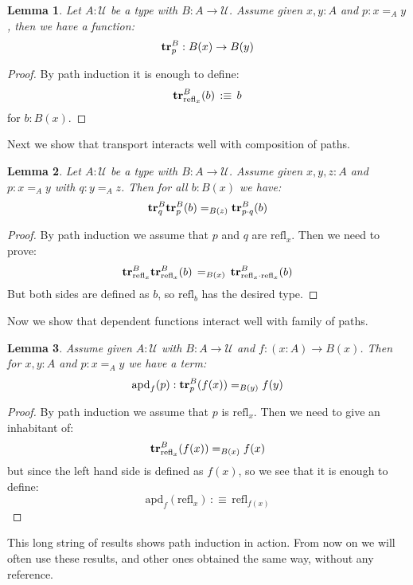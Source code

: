 \documentclass{article}
\newcommand{\sse}[1]{\medbreak \subsection{#1}}
\newcommand{\U}{{\mathcal U}}
\renewcommand{\r}{\rightarrow}
\newcommand{\apd}{\mathrm{apd}}
\newcommand{\refl}{\mathrm{refl}}
\newcommand{\id}{\mathrm{\bf id}}
\newcommand{\tr}{\mathrm{\bf tr}}
\newtheorem{lemma}{Lemma}
\begin{document}
\begin{lemma}
Let $A:\U$ be a type with $B:A\r \U$. Assume given $x,y:A$ and $p:x=_Ay$, then we have a function:
\[\tr_p^B : B(x) \r B(y)\]
\end{lemma}
\begin{proof}
By path induction it is enough to define:
\[\tr_{\refl_x}^B(b) \, :\equiv \, b\]
for $b:B(x)$.
\end{proof}

Next we show that transport interacts well with composition of paths. %

\begin{lemma}
Let $A:\U$ be a type with $B:A\r \U$. Assume given $x,y,z:A$ and $p:x=_Ay$ with $q:y=_Az$. Then for all $b:B(x)$ we have:
\[\tr_{q}^B\tr_p^B(b) =_{B(z)} \tr_{p\cdot q}^B(b)\]
\end{lemma}
\begin{proof}
By path induction we assume that $p$ and $q$ are $\refl_x$. Then we need to prove:
\[\tr_{\refl_x}^B\tr^B_{\refl_x}(b) \, =_{B(x)}\, \tr_{\refl_x\cdot \refl_x}^B(b)\]
But both sides are defined as $b$, so $\refl_b$ has the desired type.
\end{proof}

Now we show that dependent functions interact well with family of paths.

\begin{lemma}
Assume given $A:\U$ with $B:A\r \U$ and $f:(x:A)\r B(x)$. Then for $x,y:A$ and $p:x=_Ay$ we have a term:
\[\apd_f(p) : \tr^B_p(f(x)) =_{B(y)} f(y)\]
\end{lemma}
\begin{proof}
By path induction we assume that $p$ is $\refl_x$. Then we need to give an inhabitant of:
\[\tr^B_{\refl_x}(f(x))=_{B(x)} f(x)\]
but since the left hand side is defined as $f(x)$, so we see that it is enough to define:
\[\apd_f(\refl_x) \, :\equiv\, \refl_{f(x)}\]%
\end{proof}

This long string of results shows path induction in action. From now on we will often use these results, and other ones obtained the same way, without any reference.

\end{document}

